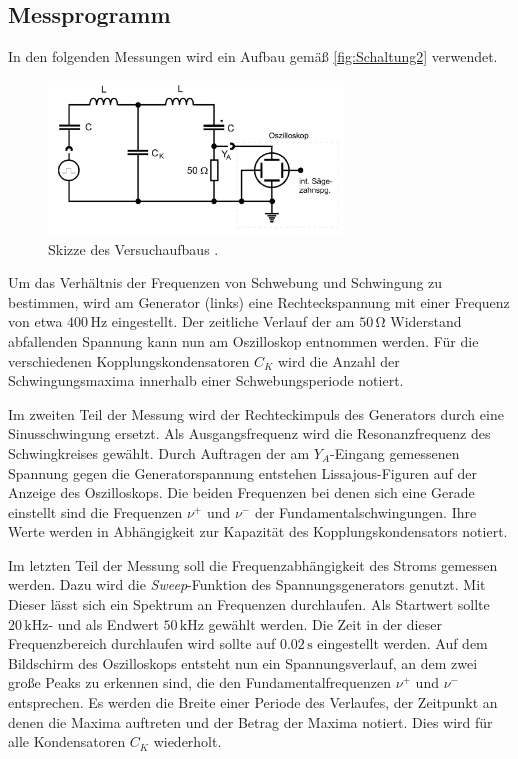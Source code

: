 \subsection{Messprogramm}
\label{subsec:Messprogramm}
In den folgenden Messungen wird ein Aufbau gemäß \autoref{fig:Schaltung2} verwendet. 
\begin{figure}
    \centering
	\caption{Skizze des Versuchaufbaus \cite{v355}.}
    \label{fig:Schaltung2}
    \includegraphics[width=0.7\textwidth]{content/Schaltung2.jpg}
\end{figure}
Um das Verhältnis der Frequenzen von Schwebung und Schwingung zu bestimmen, wird am Generator (links) eine Rechteckspannung mit einer Frequenz von etwa $400\, \unit{\hertz}$
eingestellt. Der zeitliche Verlauf der am $50 \, \unit{\ohm}$ Widerstand abfallenden Spannung kann nun am Oszilloskop entnommen werden. Für die verschiedenen 
Kopplungskondensatoren $C_K$ wird die Anzahl der Schwingungsmaxima innerhalb einer Schwebungsperiode notiert.

Im zweiten Teil der Messung wird der Rechteckimpuls des Generators durch eine Sinusschwingung ersetzt. Als Ausgangsfrequenz wird die Resonanzfrequenz des Schwingkreises
gewählt. Durch Auftragen der am $Y_A$-Eingang gemessenen Spannung gegen die Generatorspannung entstehen Lissajous-Figuren auf der Anzeige des Oszilloskops. Die beiden 
Frequenzen bei denen sich eine Gerade einstellt sind die Frequenzen $\nu^+$ und $\nu^-$ der Fundamentalschwingungen. Ihre Werte werden in Abhängigkeit zur Kapazität 
des Kopplungskondensators notiert.

Im letzten Teil der Messung soll die Frequenzabhängigkeit des Stroms gemessen werden. Dazu wird die \textit{Sweep}-Funktion des Spannungsgenerators genutzt. Mit Dieser
lässt sich ein Spektrum an Frequenzen durchlaufen. Als Startwert sollte $20 \, \unit{\kilo\hertz}$- und als Endwert $50 \, \unit{\kilo\hertz}$ gewählt werden. Die Zeit 
in der dieser Frequenzbereich durchlaufen wird sollte auf $0.02 \, \unit{\second}$ eingestellt werden. Auf dem Bildschirm des Oszilloskops entsteht nun ein Spannungsverlauf,
an dem zwei große Peaks zu erkennen sind, die den Fundamentalfrequenzen $\nu^+$ und $\nu^-$ entsprechen. Es werden die Breite einer Periode des Verlaufes, der Zeitpunkt an
denen die Maxima auftreten und der Betrag der Maxima notiert. Dies wird für alle Kondensatoren $C_K$ wiederholt.
